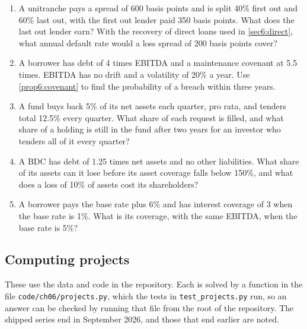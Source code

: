 \begin{chapterrefs}
\begin{enumerate}[label=\textbf{6.\arabic*}, leftmargin=*, ref=6.\arabic*]
  coverage of 1.25 on a 25 year amortisation. Find the balance due, the largest new loan and the cover.
  \item\label{ex6:ten} A unitranche pays a spread of 600 basis points and is split 40\% first out and
  60\% last out, with the first out lender paid 350 basis points. What does the last out lender earn?
  With the recovery of direct loans used in \cref{sec6:direct}, what annual default rate would a loss
  spread of 200 basis points cover?
  \item\label{ex6:eleven} A borrower has debt of 4 times EBITDA and a maintenance covenant at 5.5
  times. EBITDA has no drift and a volatility of 20\% a year. Use \cref{prop6:covenant} to find the
  probability of a breach within three years.
  \item\label{ex6:twelve} A fund buys back 5\% of its net assets each quarter, pro rata, and tenders
  total 12.5\% every quarter. What share of each request is filled, and what share of a holding is still
  in the fund after two years for an investor who tenders all of it every quarter?
  \item\label{ex6:thirteen} A BDC has debt of 1.25 times net assets and no other liabilities. What share of its assets can
  it lose before its asset coverage falls below 150\%, and what does a loss of 10\% of assets cost its
  shareholders?
  \item\label{ex6:fourteen} A borrower pays the base rate plus 6\% and has interest coverage of 3 when the base rate is
  1\%. What is its coverage, with the same EBITDA, when the base rate is 5\%?
\end{enumerate}

\subsection*{Computing projects}
\label{sec6:projects}
These use the data and code in the repository. Each is solved by a function in the file
\texttt{code/ch06/projects.py}, which the tests in \texttt{test\_projects.py} run, so an answer
can be checked by running that file from the root of the repository. The shipped series end in
September 2026, and those that end earlier are noted.


\end{chapterrefs}
